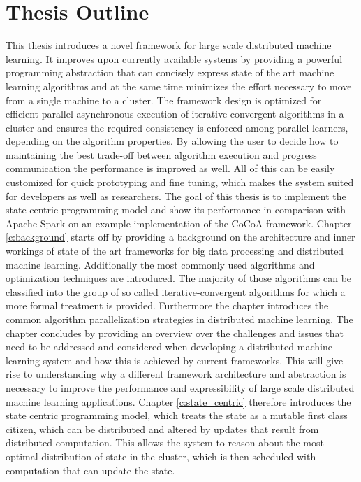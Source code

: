 \section{Thesis Outline}
This thesis introduces a novel framework for large scale distributed machine learning.
It improves upon currently available systems by providing a powerful programming abstraction that can concisely express state of the art machine learning algorithms and at the same time minimizes the effort necessary to move from a single machine to a cluster.
The framework design is optimized for efficient parallel asynchronous execution of iterative-convergent algorithms in a cluster and ensures the required consistency is enforced among parallel learners, depending on the algorithm properties. By allowing the user to decide how to maintaining the best trade-off between algorithm execution and progress communication the performance is improved as well.
All of this can be easily customized for quick prototyping and fine tuning, which makes the system suited for developers as well as researchers.
The goal of this thesis is to implement the state centric programming model and show its performance in comparison with Apache Spark on an example implementation of the CoCoA \cite{Jaggi2014} framework.
Chapter \ref{c:background} starts off by providing a background on the architecture and inner workings of state of the art frameworks for big data processing and distributed machine learning.
Additionally the most commonly used algorithms and optimization techniques are introduced.
The majority of those algorithms can be classified into the group of so called iterative-convergent algorithms for which a more formal treatment is provided.
Furthermore the chapter introduces the common algorithm parallelization strategies in distributed machine learning.
The chapter concludes by providing an overview over the challenges and issues that need to be addressed and considered when developing a distributed machine learning system and how this is achieved by current frameworks.
This will give rise to understanding why a different framework architecture and abstraction is necessary to improve the performance and expressibility of large scale distributed machine learning applications.
Chapter \ref{c:state_centric} therefore introduces the state centric programming model, which treats the state as a mutable first class citizen, which can be distributed and altered by updates that result from distributed computation.
This allows the system to reason about the most optimal distribution of state in the cluster, which is then scheduled with computation that can update the state.
